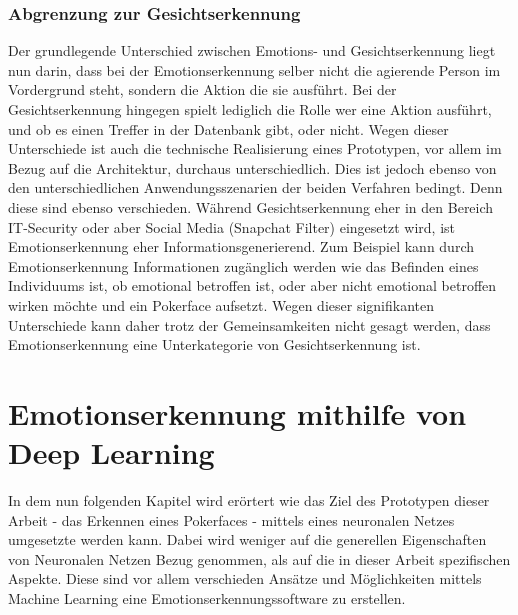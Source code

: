 \documentclass[12pt, a4paper]{scrbook}
\begin{document}
\subsubsection{Abgrenzung zur Gesichtserkennung}
Der grundlegende Unterschied zwischen Emotions- und Gesichtserkennung liegt nun darin, dass bei der Emotionserkennung selber nicht die agierende Person im Vordergrund steht, sondern die Aktion die sie ausführt.
Bei der Gesichtserkennung hingegen spielt lediglich die Rolle wer eine Aktion ausführt, und ob es einen Treffer in der Datenbank gibt, oder nicht. Wegen dieser Unterschiede ist auch die technische Realisierung eines Prototypen, vor allem im Bezug auf die Architektur,  durchaus unterschiedlich. Dies ist jedoch ebenso von den unterschiedlichen Anwendungsszenarien der beiden Verfahren bedingt.
 Denn diese sind ebenso verschieden. Während Gesichtserkennung eher in den Bereich IT-Security oder aber Social Media (Snapchat Filter) eingesetzt wird, ist Emotionserkennung eher Informationsgenerierend.
Zum Beispiel kann durch Emotionserkennung Informationen zugänglich werden wie das Befinden eines Individuums ist, ob emotional betroffen ist, oder aber nicht emotional betroffen wirken möchte und ein Pokerface aufsetzt.
Wegen dieser signifikanten Unterschiede kann daher trotz der Gemeinsamkeiten nicht gesagt werden, dass Emotionserkennung eine Unterkategorie von Gesichtserkennung ist.

\section{Emotionserkennung mithilfe von Deep Learning}
In dem nun folgenden Kapitel wird erörtert wie das Ziel des Prototypen dieser Arbeit - das Erkennen eines Pokerfaces - mittels eines neuronalen Netzes umgesetzte werden kann. Dabei wird weniger auf die generellen Eigenschaften von Neuronalen Netzen Bezug genommen, als auf die in dieser Arbeit spezifischen Aspekte. Diese sind vor allem verschieden Ansätze und Möglichkeiten mittels Machine Learning eine Emotionserkennungssoftware zu erstellen.
\end{document}
